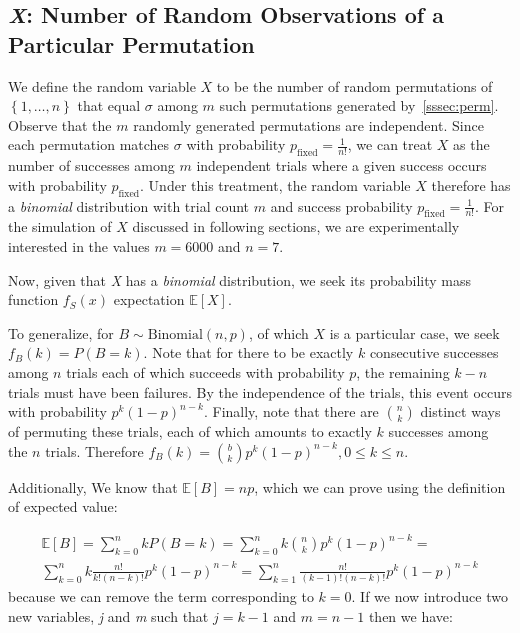 \documentclass[11pt, oneside]{article}   	%
\begin{document}
\subsection{\textit{X}: Number of Random Observations of a Particular Permutation}\label{ssec:x}
We define the random variable $X$ to be the number of random permutations of $\left\{1, \dots, n\right\}$ that equal $\sigma$ among $m$ such permutations generated by~\ref{sssec:perm}. Observe that the $m$ randomly generated permutations are independent. Since each permutation matches $\sigma$ with probability $p_{\text{fixed}} = \frac{1}{n!}$, we can treat $X$ as the number of successes among $m$ independent trials where a given success occurs with probability $p_{\text{fixed}}$. Under this treatment, the random variable $X$ therefore has a \textit{binomial} distribution with trial count $m$ and success probability $p_{\text{fixed}} = \frac{1}{n!}$. For the simulation of $X$ discussed in following sections, we are experimentally interested in the values $m = 6000$ and $n = 7$.

Now, given that \textit{X} has a \textit{binomial} distribution, we seek its probability mass function $f_S(x)$ expectation $\mathbb{E}[X]$.

To generalize, for $B \sim \text{Binomial}(n, p)$, of which $X$ is a particular case, we seek $f_B(k) = P(B = k)$. Note that for there to be exactly $k$ consecutive successes among $n$ trials each of which succeeds with probability $p$, the remaining $k - n$ trials must have been failures. By the independence of the trials, this event occurs with probability $p^k(1-p)^{n-k}$. Finally, note that there are ${n \choose k}$ distinct ways of permuting these trials, each of which amounts to exactly $k$ successes among the $n$ trials. Therefore $f_B(k) = {b \choose k}p^k(1-p)^{n-k}, 0 \leq k \leq n$.

Additionally, We know that $\mathbb{E}[B] = np$, which we can prove using the definition of expected value:

\begin{equation*}
\begin{split}
  \mathbb{E}[B] = \sum_{k=0}^{n}kP(B=k)=
  \sum_{k=0}^{n}k\binom{n}{k}p^k(1-p)^{n-k}=\\
  \sum_{k=0}^{n}k \frac{n!}{k!(n-k)!}p^k(1-p)^{n-k}=
  \sum_{k=1}^{n}\frac{n!}{(k-1)!(n-k)!}p^k(1-p)^{n-k}
\end{split}
\end{equation*}
because we can remove the term corresponding to $k=0$. If we now introduce two new variables, \textit{j} and \textit{m} such that $j=k-1$ and $m=n-1$ then we have:
\end{document}
